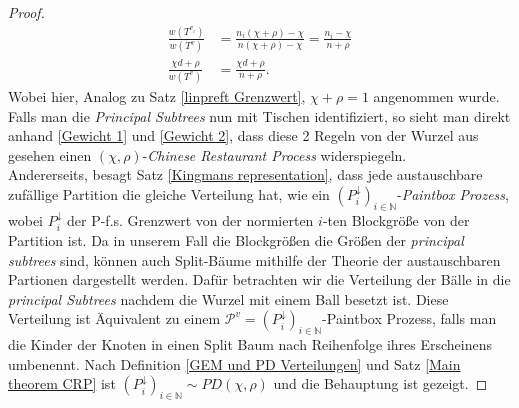 \begin{theorem}
\begin{proof}
    \begin{align}
         \frac{w(T^{v_i})}{w(T^{v})} &= \frac{n_i(\chi + \rho) - \chi}{n(\chi+ \rho) - \chi} = \frac{n_i - \chi}{ n + \rho} \label{Gewicht 1}\\  
         \frac{\chi d + \rho}{w(T^{v})} &= \frac{\chi d + \rho}{ n + \rho} \label{Gewicht 2}.
    \end{align}
    Wobei hier, Analog zu Satz \ref{linpreft Grenzwert}, $\chi + \rho = 1$ angenommen wurde.  Falls man die \textit{Principal Subtrees} nun mit Tischen identifiziert, so sieht man direkt anhand \ref{Gewicht 1} und \ref{Gewicht 2}, dass diese 2 Regeln von der Wurzel aus gesehen einen $(\chi,\rho)$-\textit{Chinese Restaurant Process} widerspiegeln.\\
    Andererseits, besagt Satz \ref{Kingmans representation}, dass jede austauschbare zufällige Partition die gleiche Verteilung hat, wie ein $(P^{\downarrow}_i)_{i \in \mathbb{N}}$-\textit{Paintbox Prozess}, wobei $P^{\downarrow}_i$ der P-f.s. Grenzwert von der normierten $i$-ten Blockgröße von der Partition ist. Da in unserem Fall die Blockgrößen die Größen der \textit{principal subtrees} sind, können auch Split-Bäume mithilfe der Theorie der austauschbaren Partionen dargestellt werden. Dafür betrachten wir die Verteilung der Bälle in die \textit{principal Subtrees} nachdem die Wurzel mit einem Ball besetzt ist. Diese Verteilung ist Äquivalent zu einem $\mathcal{P}^{v} = (P_i^{\downarrow})_{i \in \mathbb{N}}$-Paintbox Prozess, falls man die Kinder der Knoten in einen Split Baum nach Reihenfolge ihres Erscheinens umbenennt. Nach Definition \ref{GEM und PD Verteilungen} und Satz \ref{Main theorem CRP} ist $(P^{\downarrow}_i)_{i \in \mathbb{N}} \sim PD(\chi,\rho)$ und die Behauptung ist gezeigt. 

\end{proof}
\begin{Bemerkung}
    
\end{Bemerkung}

\end{theorem}

